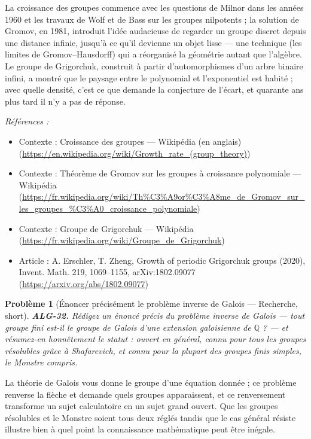 \documentclass[11pt]{article}
\newtheorem{problem}{Problème}
\newenvironment{refs}{\par\small\noindent\emph{Références :}\begin{itemize}\setlength\itemsep{0pt}}{\end{itemize}\normalsize}
\begin{document}
\noindent La croissance des groupes commence avec les questions de Milnor dans les années 1960 et
les travaux de Wolf et de Bass sur les groupes nilpotents ; la solution de Gromov, en 1981, introduit l'idée
audacieuse de regarder un groupe discret depuis une distance infinie, jusqu'à ce qu'il devienne un objet
lisse --- une technique (les limites de Gromov--Hausdorff) qui a réorganisé la géométrie autant que l'algèbre.
Le groupe de Grigorchuk, construit à partir d'automorphismes d'un arbre binaire infini, a montré que le
paysage entre le polynomial et l'exponentiel est habité ; avec quelle densité, c'est ce que demande la
conjecture de l'écart, et quarante ans plus tard il n'y a pas de réponse.

\begin{refs}
\item Contexte : Croissance des groupes --- Wikipédia (en anglais) (\url{https://en.wikipedia.org/wiki/Growth_rate_(group_theory)})
\item Contexte : Théorème de Gromov sur les groupes à croissance polynomiale --- Wikipédia (\url{https://fr.wikipedia.org/wiki/Th%C3%A9or%C3%A8me_de_Gromov_sur_les_groupes_%C3%A0_croissance_polynomiale})
\item Contexte : Groupe de Grigorchuk --- Wikipédia (\url{https://fr.wikipedia.org/wiki/Groupe_de_Grigorchuk})
\item Article : A. Erschler, T. Zheng, \og{} Growth of periodic Grigorchuk groups \fg{} (2020), Invent. Math. 219, 1069--1155, arXiv:1802.09077 (\url{https://arxiv.org/abs/1802.09077})
\end{refs}

\bigskip

\begin{problem}[{Énoncer précisément le problème inverse de Galois --- Recherche, short}]
\textbf{ALG-32.} Rédigez un énoncé précis du problème inverse de Galois --- tout groupe fini est-il le groupe de Galois d'une extension galoisienne de $ \mathbb{Q} $ ? --- et résumez-en honnêtement le statut : ouvert en général, connu pour tous les groupes résolubles grâce à Shafarevich, et connu pour la plupart des groupes finis simples, le Monstre compris.
\end{problem}

\noindent La théorie de Galois vous donne le groupe d'une équation donnée ; ce problème renverse la flèche et demande quels groupes apparaissent, et ce renversement transforme un sujet calculatoire en un sujet grand ouvert. Que les groupes résolubles et le Monstre soient tous deux réglés tandis que le cas général résiste illustre bien à quel point la connaissance mathématique peut être inégale.
\end{document}
